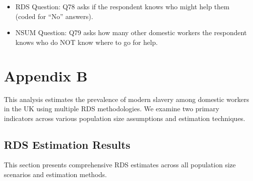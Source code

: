 \documentclass[
  12pt,
  letterpaper,
  DIV=11,
  numbers=noendperiod]{scrartcl}
\providecommand{\tightlist}{%
  \setlength{\itemsep}{0pt}\setlength{\parskip}{0pt}}
\theoremstyle{plain}
\theoremstyle{definition}
\begin{document}
\begin{itemize}
  \begin{itemize}
  \tightlist
  \item
    RDS Question: Q78 asks if the respondent knows who might help them
    (coded for ``No'' answers).
  \item
    NSUM Question: Q79 asks how many other domestic workers the
    respondent knows who do NOT know where to go for help.
  \end{itemize}
\end{itemize}

\newpage

\section{Appendix B}\label{app-sens}

This analysis estimates the prevalence of modern slavery among domestic
workers in the UK using multiple RDS methodologies. We examine two
primary indicators across various population size assumptions and
estimation techniques.

\subsection{RDS Estimation Results}\label{rds-estimation-results}

This section presents comprehensive RDS estimates across all population
size scenarios and estimation methods.
\end{document}
